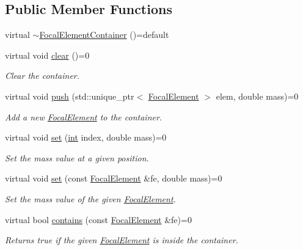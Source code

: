 \subsection*{Public Member Functions}
\begin{DoxyCompactItemize}
\item 
virtual \hyperlink{classFocalElementContainer_a939ab96df66f872bf1600e9536c15aaf}{$\sim$\+Focal\+Element\+Container} ()=default
\item 
virtual void \hyperlink{classFocalElementContainer_a79977845eba147c3d29d8c500dbe593c}{clear} ()=0
\begin{DoxyCompactList}\small\item\em Clear the container. \end{DoxyCompactList}\item 
virtual void \hyperlink{classFocalElementContainer_a951895e83f8ef4ba79fa1c45d2d3c1ac}{push} (std\+::unique\+\_\+ptr$<$ \hyperlink{classFocalElement}{Focal\+Element} $>$ elem, double mass)=0
\begin{DoxyCompactList}\small\item\em Add a new \hyperlink{classFocalElement}{Focal\+Element} to the container. \end{DoxyCompactList}\item 
virtual void \hyperlink{classFocalElementContainer_a37edfcf750dfc72a7f3a92a2ab6bd62e}{set} (\hyperlink{CMakeCache_8txt_a79a3d8790b2588b09777910863574e09}{int} index, double mass)=0
\begin{DoxyCompactList}\small\item\em Set the mass value at a given position. \end{DoxyCompactList}\item 
virtual void \hyperlink{classFocalElementContainer_a444a088fc937650226f2ecdd1db59510}{set} (const \hyperlink{classFocalElement}{Focal\+Element} \&fe, double mass)=0
\begin{DoxyCompactList}\small\item\em Set the mass value of the given \hyperlink{classFocalElement}{Focal\+Element}. \end{DoxyCompactList}\item 
virtual bool \hyperlink{classFocalElementContainer_ad42831667cd25d9749ead2693b9762c4}{contains} (const \hyperlink{classFocalElement}{Focal\+Element} \&fe)=0
\begin{DoxyCompactList}\small\item\em Returns true if the given \hyperlink{classFocalElement}{Focal\+Element} is inside the container. \end{DoxyCompactList}\item 

\end{DoxyCompactItemize}
